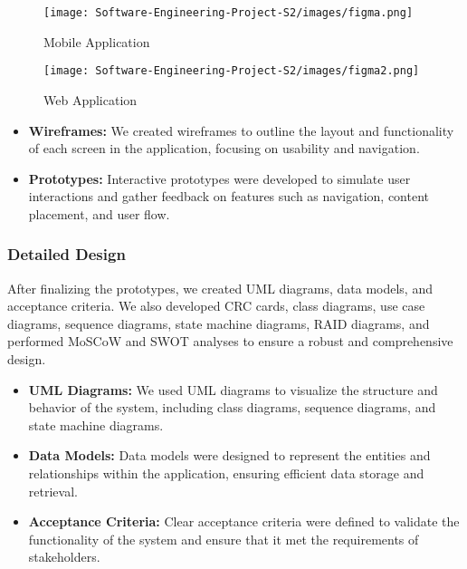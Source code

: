 \begin{figure}[H]
    \centering
    \texttt{[image: Software-Engineering-Project-S2/images/figma.png]}
    \caption{Mobile Application}
    \label{fig:figma}
  \end{figure}

  \begin{figure}[H]
    \centering
    \texttt{[image: Software-Engineering-Project-S2/images/figma2.png]}
    \caption{Web Application}
    \label{fig:figma2}
  \end{figure}


\begin{itemize}
  \item \textbf{Wireframes:} We created wireframes to outline the layout and functionality of each screen in the application, focusing on usability and navigation.
  
  \item \textbf{Prototypes:} Interactive prototypes were developed to simulate user interactions and gather feedback on features such as navigation, content placement, and user flow.
\end{itemize}

\subsubsection{Detailed Design}
After finalizing the prototypes, we created UML diagrams, data models, and acceptance criteria. We also developed CRC cards, class diagrams, use case diagrams, sequence diagrams, state machine diagrams, RAID diagrams, and performed MoSCoW and SWOT analyses to ensure a robust and comprehensive design.

\begin{itemize}
  \item \textbf{UML Diagrams:} We used UML diagrams to visualize the structure and behavior of the system, including class diagrams, sequence diagrams, and state machine diagrams.
  
  \item \textbf{Data Models:} Data models were designed to represent the entities and relationships within the application, ensuring efficient data storage and retrieval.
  
  \item \textbf{Acceptance Criteria:} Clear acceptance criteria were defined to validate the functionality of the system and ensure that it met the requirements of stakeholders.
\end{itemize}

